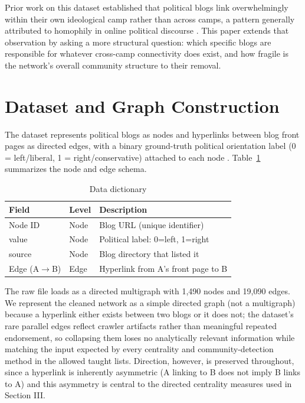 \documentclass[conference]{IEEEtran}
\begin{document}
Prior work on this dataset established that political blogs link overwhelmingly within their own ideological camp rather than across camps, a pattern generally attributed to homophily in online political discourse \cite{adamic2005}. This paper extends that observation by asking a more structural question: which specific blogs are responsible for whatever cross-camp connectivity does exist, and how fragile is the network's overall community structure to their removal.

\section{Dataset and Graph Construction}
The dataset represents political blogs as nodes and hyperlinks between blog front pages as directed edges, with a binary ground-truth political orientation label (0 = left/liberal, 1 = right/conservative) attached to each node \cite{adamic2005}. Table~\ref{tab:datadict} summarizes the node and edge schema.

\begin{table}[htbp]
\caption{Data dictionary}
\label{tab:datadict}
\centering
\begin{tabular}{@{}lll@{}}
\toprule
Field & Level & Description \\
\midrule
Node ID & Node & Blog URL (unique identifier) \\
value & Node & Political label: 0=left, 1=right \\
source & Node & Blog directory that listed it \\
Edge (A$\to$B) & Edge & Hyperlink from A's front page to B \\
\bottomrule
\end{tabular}
\end{table}

The raw file loads as a directed multigraph with 1,490 nodes and 19,090 edges. We represent the cleaned network as a simple directed graph (not a multigraph) because a hyperlink either exists between two blogs or it does not; the dataset's rare parallel edges reflect crawler artifacts rather than meaningful repeated endorsement, so collapsing them loses no analytically relevant information while matching the input expected by every centrality and community-detection method in the allowed taught lists. Direction, however, is preserved throughout, since a hyperlink is inherently asymmetric (A linking to B does not imply B links to A) and this asymmetry is central to the directed centrality measures used in Section III.
\end{document}
